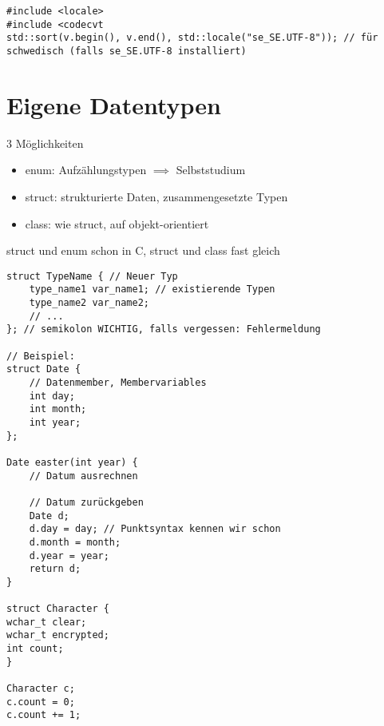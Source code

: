 \documentclass[a4paper]{scrartcl}
\theoremstyle{definition}
\theoremstyle{plain}
\theoremstyle{remark}
\theoremstyle{remark}
\begin{document}
\begin{verbatim}
#include <locale>
#include <codecvt
std::sort(v.begin(), v.end(), std::locale("se_SE.UTF-8")); // für schwedisch (falls se_SE.UTF-8 installiert)
\end{verbatim}
\section{Eigene Datentypen}
\label{sec-18}
3 Möglichkeiten
\begin{itemize}
\item enum: Aufzählungstypen $\implies$ Selbststudium
\item struct: strukturierte Daten, zusammengesetzte Typen
\item class: wie struct, auf objekt-orientiert
\end{itemize}
struct und enum schon in C, struct und class fast gleich
\begin{verbatim}
struct TypeName { // Neuer Typ
	type_name1 var_name1; // existierende Typen
	type_name2 var_name2;
	// ...
}; // semikolon WICHTIG, falls vergessen: Fehlermeldung

// Beispiel:
struct Date {
	// Datenmember, Membervariables
	int day;
	int month;
	int year;
};

Date easter(int year) {
	// Datum ausrechnen

	// Datum zurückgeben
	Date d;
	d.day = day; // Punktsyntax kennen wir schon
	d.month = month;
	d.year = year;
	return d;
}

struct Character {
wchar_t clear;
wchar_t encrypted;
int count;
}

Character c;
c.count = 0;
c.count += 1;
\end{verbatim}
\end{document}
